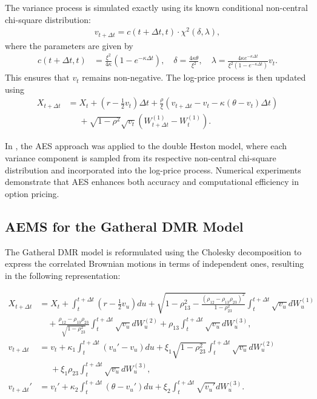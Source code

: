 \documentclass[graybox]{svmult}
\begin{document}
The variance process is simulated exactly using its known conditional non-central chi-square distribution:
\begin{align*}
    v_{t + \Delta t} = c(t + \Delta t, t) \cdot \chi^2 (\delta, \lambda),
\end{align*}
where the parameters are given by
\begin{align*}
    c(t + \Delta t, t) &= \frac{\xi^2}{4\kappa} \left( 1 - e^{-\kappa \Delta t} \right), \quad
    \delta = \frac{4 \kappa \theta}{\xi^2}, \quad
    \lambda = \frac{4 \kappa e^{-\kappa \Delta t}}{\xi^2 (1 - e^{-\kappa \Delta t})} v_t.
\end{align*}
This ensures that $v_t$ remains non-negative. The log-price process is then updated using
\begin{align*}
    X_{t+\Delta t} &= X_t + \left( r - \frac{1}{2} v_t \right) \Delta t + \frac{\rho}{\xi} \left( v_{t+\Delta t} - v_t - \kappa (\theta - v_t) \Delta t \right) \\
   &\phantom{=}+ \sqrt{1 - \rho^2} \sqrt{v_t} (W_{t+\Delta t}^{(1)} - W_t^{(1)}).
\end{align*}

In \cite{kalicanin2022bermudan}, the AES approach was applied to the double Heston model, where each variance component is sampled from its respective non-central chi-square distribution and incorporated into the log-price process. Numerical experiments demonstrate that AES enhances both accuracy and computational efficiency in option pricing.





\subsection{AEMS for the Gatheral DMR Model}


The Gatheral DMR model is reformulated using the Cholesky decomposition to express the correlated Brownian motions in terms of independent ones, resulting in the following representation:

\begin{align*}
X_{t+\Delta t} &= X_t + \int_t^{t+\Delta t} \left(r - \frac{1}{2} v_u \right) du 
+ \sqrt{1 - \rho_{13}^2 - \frac{(\rho_{12} - \rho_{13} \rho_{23})^2}{1 - \rho_{23}^2}} \int_t^{t+\Delta t} \sqrt{v_u} dW_u^{(1)} \\
&\quad + \frac{\rho_{12} - \rho_{13} \rho_{23}}{\sqrt{1 - \rho_{23}^2}} \int_t^{t+\Delta t} \sqrt{v_u} dW_u^{(2)} 
+ \rho_{13} \int_t^{t+\Delta t} \sqrt{v_u} dW_u^{(3)}, \\
v_{t+\Delta t} &= v_t + \kappa_1 \int_t^{t+\Delta t} (v_u' - v_u) du 
+ \xi_1 \sqrt{1 - \rho_{23}^2} \int_t^{t+\Delta t} \sqrt{v_u} dW_u^{(2)} 
\\
& \phantom{=}+ \xi_1 \rho_{23} \int_t^{t+\Delta t} \sqrt{v_u} dW_u^{(3)}, \\
v_{t+\Delta t}' &= v_t' + \kappa_2 \int_t^{t+\Delta t} (\theta - v_u') du 
+ \xi_2 \int_t^{t+\Delta t} \sqrt{v_u'} dW_u^{(3)}.
\end{align*}
\end{document}
